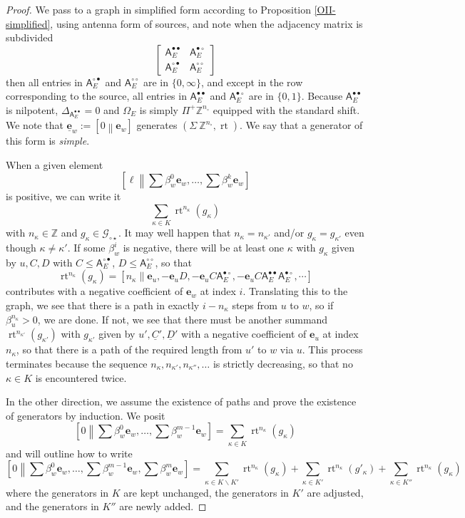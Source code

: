 \documentclass[12pt]{amsbook}%
\newcommand{\rt}{\operatorname{rt}}
\newcommand{\ee}{{\mathbf e}}
\theoremstyle{defin}
\theoremstyle{remark}
\numberwithin{equation}{chapter}
\numberwithin{theor}{section}
\newcommand{\ZZ}{\mathbb{Z}}
\newcommand{\singgen}{\mathcal G_{\circ\star}}
\newcommand{\nsX}{\Sigma\ }
\newcommand{\osX}{\Pi^+}
\newcommand{\oXe}[2]{\left[#1\left\|{#2}\right.\right]}
\newcommand{\singX}{{\circ}}
\newcommand{\eee}{\underline{\mathbf e}}
\newcommand{\nos}{{n_\singX}}
\newcommand{\adjRR}{\mathsf{A}^{\bullet\bullet}}
\newcommand{\adjRS}{\mathsf{A}^{\bullet\circ}}
\newcommand{\adjSR}{\mathsf{A}^{\circ\bullet }}
\newcommand{\adjSS}{\mathsf{A}^{\circ\circ}}
\begin{document}
\begin{proof}
We pass to a graph  in simplified form according to Proposition \ref{OII-simplified}, using antenna form of sources, and note when the adjacency matrix is subdivided 
\[
\left[\begin{array}{c|c}
\adjRR_E&\adjRS_E\\\hline
\adjSR_E&\adjSS_E
\end{array}\right]
\]
then all entries in $\adjSR_E$ and $\adjSS_E$ are in $\{0,\infty\}$, and except in the row corresponding to the source, all entries in $\adjRR_E$ and $\adjRS_E$ are in $\{0,1\}$. 
Because $\adjRR_E$ is nilpotent, $\Delta_{\adjRR_E}=0$ and $\Omega_E$ is simply $\osX \ZZ^\nos$ equipped with the standard shift.
We note that $\eee_w:=\oXe{0}{\ee_w}$ generates $(\nsX \ZZ^\nos,\rt)$. We say that a generator of this form is \emph{simple}.


When a given element 
\[
\oXe{\ell}{\textstyle \sum \beta^0_w\ee_w,\dots,\sum \beta^k_w\ee_w}
\]
is positive, we can write it
\[
\sum_{\kappa\in K} \rt^{n_\kappa}(g_\kappa)
\]
with $n_\kappa\in\ZZ$ and $g_\kappa\in \singgen$.  It may well happen that $n_\kappa=n_{\kappa'}$ and/or $g_\kappa=g_{\kappa'}$ even though $\kappa\not=\kappa'$.  If some $\beta^i_w$ is negative, there will be at least one $\kappa$ with
$
g_{\kappa}
$
given by $u,{C},{D}$ with $C\leq \adjSR_E$, $D\leq \adjSS_E$,
so that
\[
 \rt^{n_{\kappa}}(g_\kappa)=\oXe{n_\kappa}{\ee_{u},- \ee_u D,-\ee_uC\adjRS_E ,-\ee_u C\adjRR_E\adjRS_E,\cdots}
 \]
 contributes with a negative coefficient of $\ee_w$ at index $i$. Translating this to the graph,  we see that there is a path in exactly $i-n_{\kappa}$ steps from $u$ to $w$, so if $\beta^{n_{\kappa}}_u>0$, we are done. If not, we see that there must be another summand $ \rt^{n_{\kappa'}}(g_{\kappa'})$ with $g_{\kappa'}$ given by $u',\underline{C}',\underline{D}'$  with a negative coefficient of $\ee_u$ at index $n_{\kappa}$, so that there is a path of the required length from $u'$ to $w$ via $u$. This process terminates because the sequence $n_{\kappa},n_{\kappa'},n_{\kappa''},\dots$ is strictly decreasing, so that no $\kappa\in K$ is encountered twice.
 
 In the other direction, we assume the existence of paths and prove the existence of generators by induction. We posit 
\[
\oXe{0}{\textstyle \sum \beta^0_w\ee_w,\dots,\sum \beta^{m-1}_w\ee_w}=\sum_{\kappa\in K}\rt^{n_\kappa}(g_\kappa)
\]
and will outline how to write
\[
\oXe{0}{\textstyle \sum \beta^0_w\ee_w,\dots,\sum \beta^{m-1}_w\ee_w,\sum \beta^{m}_w\ee_w}=\sum_{\kappa\in K\backslash K'}\rt^{n_\kappa}(g_\kappa)+\sum_{\kappa\in K'}\rt^{n_\kappa}(g'_\kappa)+\sum_{\kappa\in K''}\rt^{n_\kappa}(g_\kappa)
\]
where the generators in $K$ are kept unchanged, the generators in $K'$ are adjusted, and the generators in $K''$ are newly added. %


\end{proof}
\end{document}
